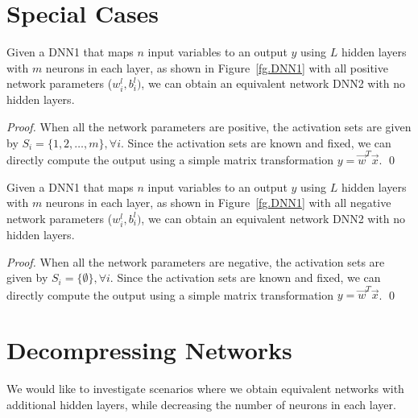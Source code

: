 \documentclass[runningheads,a4paper]{llncs}
\begin{document}
\section{Special Cases}

\begin{theorem}
Given a {\sc DNN1} that maps $n$ input variables to an output $y$ using $L$ hidden layers with $m$ neurons in each layer, as shown in Figure~\ref{fg.DNN1} with all positive network parameters ($w^l_i,b^l_i)$, we can obtain an equivalent network {\sc DNN2} with no hidden layers. 
\label{eq.deepTransformL_To_0_positiveweights}
\end{theorem}
\begin{proof}
When all the network parameters are positive, the activation sets are given by $S_i = \{1,2,\dots,m\},\forall i$. Since the activation sets are known and fixed, we can directly compute the output using a simple matrix transformation $y = \vec{w}^T \vec{x}$. 
\qed
\end{proof}

\begin{theorem}
Given a {\sc DNN1} that maps $n$ input variables to an output $y$ using $L$ hidden layers with $m$ neurons in each layer, as shown in Figure~\ref{fg.DNN1} with all negative network parameters ($w^l_i,b^l_i)$, we can obtain an equivalent network {\sc DNN2} with no hidden layers. 
\label{eq.eq.deepTransformL_To_0_negativeweights}
\end{theorem}
\begin{proof}
When all the network parameters are negative, the activation sets are given by $S_i = \{\emptyset \},\forall i$. Since the activation sets are known and fixed, we can directly compute the output using a simple matrix transformation $y = \vec{w}^T \vec{x}$. 
\qed
\end{proof}

\section{Decompressing Networks}
We would like to investigate scenarios where we obtain equivalent networks with additional hidden layers, while decreasing the number of neurons in each layer.

{\small


}
\end{document}
